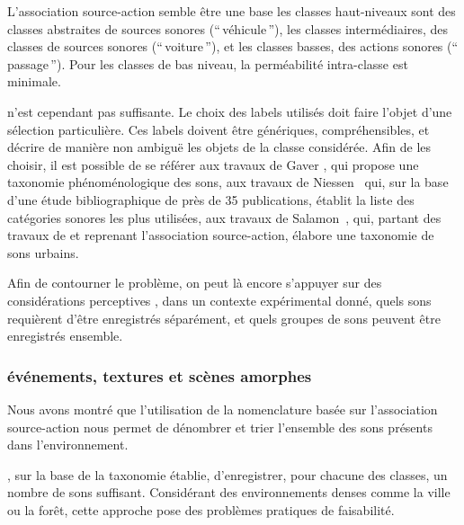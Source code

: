 L'association source-action semble être une base  les classes haut-niveaux sont des classes abstraites de sources sonores (``\,véhicule\,''), les classes intermédiaires, des classes de sources sonores (``\,voiture\,''), et les classes basses, des actions sonores (``\,passage\,''). Pour les classes de bas niveau, la perméabilité intra-classe est minimale.

  n'est cependant pas suffisante. Le choix des labels utilisés doit faire l'objet d'une sélection particulière. Ces labels doivent être génériques, compréhensibles, et décrire de manière non ambiguë les objets de la classe considérée. Afin de les choisir, il est possible de se référer aux travaux de Gaver \citep{gaver1993world}, qui propose une taxonomie phénoménologique des sons, aux travaux de Niessen~\al \citep{niessen2010categories} qui, sur la base d'une étude bibliographique de près de 35 publications, établit la liste des catégories sonores les plus utilisées, aux travaux de Salamon~\al \citep{Salamon14}, qui, partant des travaux de \citep{brown2011towards} et reprenant l'association source-action, élabore une taxonomie de sons urbains.

Afin de contourner le problème, on peut là encore s’appuyer sur des considérations perceptives  , dans un contexte expérimental donné, quels sons requièrent d'être enregistrés séparément, et quels groupes de sons peuvent être enregistrés ensemble.


\subsubsection{événements, textures et scènes amorphes}

Nous avons montré que l'utilisation de la nomenclature basée sur l’association source-action nous permet de dénombrer et trier l'ensemble des sons présents dans l'environnement.

 , sur la base de la taxonomie établie, d'enregistrer, pour chacune des classes, un nombre de sons suffisant. Considérant des environnements denses comme la ville ou la forêt, cette approche pose des problèmes pratiques de faisabilité. 


